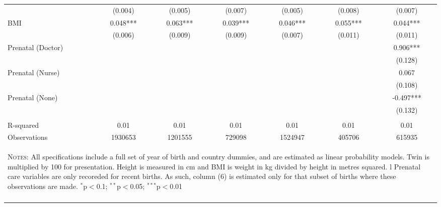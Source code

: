 \begin{landscape}
\begin{table}[htpb!]
\begin{center}
\begin{tabular}{lcccccc}
&(0.004)&(0.005)&(0.007)&(0.005)&(0.008)&(0.007)\\
BMI&0.048***&0.063***&0.039***&0.046***&0.055***&0.044***\\
&(0.006)&(0.009)&(0.009)&(0.007)&(0.011)&(0.011)\\
Prenatal (Doctor)&&&&&&0.906***\\
&&&&&&(0.128)\\
Prenatal (Nurse)&&&&&&0.067\\
&&&&&&(0.108)\\
Prenatal (None)&&&&&&-0.497***\\
&&&&&&(0.132)\\
&&&&&&\\R-squared&0.01&0.01&0.01&0.01&0.01&0.01\\
Observations &1930653&1201555&729098&1524947&405706&615935\\
\hline\hline\multicolumn{7}{p{14.3cm}}{\begin{footnotesize}\textsc{Notes:} All specifications include a full set of year of birth and  country dummies, and are estimated as linear probability models.  Twin is multiplied by 100 for presentation.  Height is measured in cm  and BMI is weight in kg divided by height in metres squared. l  Prenatal care variables are only recoreded for recent births.  As  such, column (6) is estimated only for that subset of births where  these observations are made.
$^{*}$p$<$0.1; $^{**}$p$<$0.05; $^{***}$p$<$0.01
 \end{footnotesize}}\\ \hline \normalsize \end{tabular}\end{center}\end{table}\end{landscape} 

